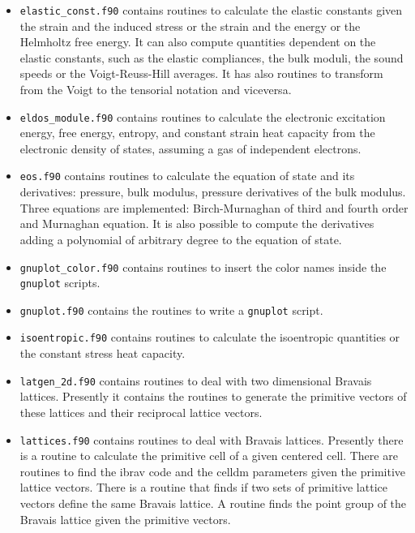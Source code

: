 \documentclass[12pt,a4paper,twoside]{report}
\begin{document}
\begin{itemize}
\item
\texttt{elastic\_const.f90} contains routines to calculate the elastic
constants given the strain and the induced stress or the strain and
the energy or the Helmholtz free energy. It can also compute
quantities dependent on the elastic constants, such as the elastic 
compliances, the bulk moduli, the sound speeds or the Voigt-Reuss-Hill 
averages. It has also routines to transform from the Voigt to the 
tensorial notation and viceversa.

\item
\texttt{eldos\_module.f90} contains routines to calculate the electronic
excitation energy, free energy, entropy, and constant strain heat capacity
from the electronic density of states, assuming a gas of independent 
electrons.   

\item
\texttt{eos.f90} contains routines to calculate the equation of state and
its derivatives: pressure, bulk modulus, pressure derivatives of the bulk
modulus. Three equations are implemented: Birch-Murnaghan of third
and fourth order and Murnaghan equation. It is also possible to compute
the derivatives adding a polynomial of arbitrary degree to the equation
of state.

\item
\texttt{gnuplot\_color.f90} contains routines to insert the color names
inside the \texttt{gnuplot} scripts.

\item
\texttt{gnuplot.f90} contains the routines to write a \texttt{gnuplot} script.

\item
\texttt{isoentropic.f90} contains routines to calculate the isoentropic
quantities or the constant stress heat capacity.

\item
\texttt{latgen\_2d.f90} contains routines to deal with two dimensional
Bravais lattices. Presently it contains the routines to generate the
primitive vectors of these lattices and their reciprocal lattice vectors.

\item \texttt{lattices.f90} contains routines to deal with Bravais lattices.
Presently there is a routine to calculate the primitive cell of
a given centered cell. There are routines to find the ibrav code and the
celldm parameters given the primitive lattice vectors. There is a routine
that finds if two sets of primitive lattice vectors define the same 
Bravais lattice. A routine finds the point group of the Bravais lattice
given the primitive vectors.


\end{itemize}
\end{document}
